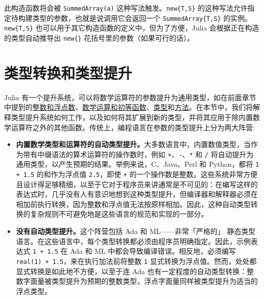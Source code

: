 此构造函数将会被 \texttt{SummedArray(a)} 这种写法触发。\texttt{new\{T,S\}} 的这种写法允许指定待构建类型的参数，也就是说调用它会返回一个 \texttt{SummedArray\{T,S\}} 的实例。\texttt{new\{T,S\}} 也可以用于其它构造函数的定义中，但为了方便，Julia 会根据正在构造的类型自动推导出 \texttt{new\{\}} 花括号里的参数（如果可行的话）。



\hypertarget{10686378388163930476}{}


\chapter{类型转换和类型提升}



Julia 有一个提升系统，可以将数学运算符的参数提升为通用类型，如在前面章节中提到的\hyperlink{8249022581856827126}{整数和浮点数}、\hyperlink{16865688524696028421}{数学运算和初等函数}、\hyperlink{8510890508040013186}{类型}和\hyperlink{3842379394166369470}{方法}。在本节中，我们将解释类型提升系统如何工作，以及如何将其扩展到新的类型，并将其应用于除内置数学运算符之外的其他函数。传统上，编程语言在参数的类型提升上分为两大阵营:



\begin{itemize}
\item \textbf{内置数学类型和运算符的自动类型提升。}大多数语言中，内置数值类型，当作为带有中缀语法的算术运算符的操作数时，例如 \texttt{+}、\texttt{-}、\texttt{*} 和 \texttt{/} 将自动提升为通用类型，以产生预期的结果。举例来说，C、Java、Perl 和 Python，都将 \texttt{1 + 1.5} 的和作为浮点值 \texttt{2.5}，即使 \texttt{+} 的一个操作数是整数。这些系统非常方便且设计得足够精细，以至于它对于程序员来讲通常是不可见的：在编写这样的表达式时，几乎没有人有意识地想到这种类型提升，但编译器和解释器必须在相加前执行转换，因为整数和浮点值无法按原样相加。因此，这种自动类型转换的复杂规则不可避免地是这些语言的规范和实现的一部分。


\item \textbf{没有自动类型提升。}这个阵营包括 Ada 和 ML——非常「严格的」 静态类型语言。在这些语言中，每个类型转换都必须由程序员明确指定。因此，示例表达式 \texttt{1 + 1.5} 在 Ada 和 ML 中都会导致编译错误。相反地，必须编写 \texttt{real(1) + 1.5}，来在执行加法前将整数 \texttt{1} 显式转换为浮点值。然而，处处都显式转换是如此地不方便，以至于连 Ada 也有一定程度的自动类型转换：整数字面量被类型提升为预期的整数类型，浮点字面量同样被类型提升为适当的浮点类型。

\end{itemize}


